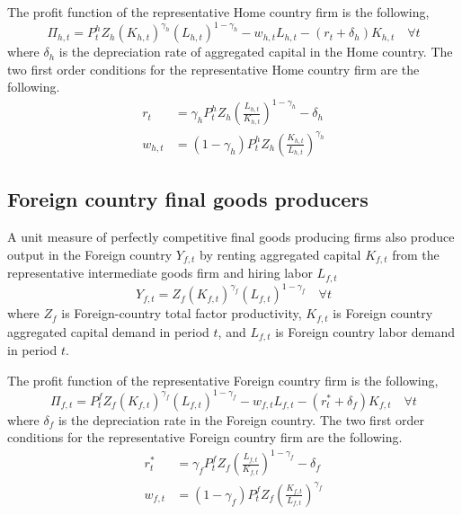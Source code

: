 \documentclass[letterpaper,12pt]{article}
\theoremstyle{definition}
\begin{document}
    The profit function of the representative Home country firm is the following,
    \begin{equation}\label{EqLgOpenProfit_H}
      \Pi_{h,t} = P^h_t Z_h \left(K_{h,t}\right)^{\gamma_h}\left(L_{h,t}\right)^{1-\gamma_h} - w_{h,t}L_{h,t} - (r_t + \delta_h)K_{h,t} \quad\forall t
    \end{equation}
    where $\delta_h$ is the depreciation rate of aggregated capital in the Home country. The two first order conditions for the representative Home country firm are the following.
    \begin{align}
      r_t &= \gamma_h P^h_t Z_h\left(\frac{L_{h,t}}{K_{h,t}}\right)^{1-\gamma_h} - \delta_h \label{EqLgOpenFirmFOCK_H} \\
      w_{h,t} &= (1-\gamma_h)P^h_t Z_h\left(\frac{K_{h,t}}{L_{h,t}}\right)^{\gamma_h} \label{EqLgOpenFirmFOCL_H}
    \end{align}


  \subsection{Foreign country final goods producers}\label{SecLgOpenFirmFinal_F}

    A unit measure of perfectly competitive final goods producing firms also produce output in the Foreign country $Y_{f,t}$ by renting aggregated capital $K_{f,t}$ from the representative intermediate goods firm and hiring labor $L_{f,t}$
    \begin{equation}\label{EqLgOpenProdFunc_F}
      Y_{f,t} = Z_f \left(K_{f,t}\right)^{\gamma_f}\left(L_{f,t}\right)^{1-\gamma_f} \quad\forall t
    \end{equation}
    where $Z_f$ is Foreign-country total factor productivity, $K_{f,t}$ is Foreign country aggregated capital demand in period $t$, and $L_{f,t}$ is Foreign country labor demand in period $t$.

    The profit function of the representative Foreign country firm is the following,
    \begin{equation}\label{EqLgOpenProfit_F}
      \Pi_{f,t} = P^f_t Z_f \left(K_{f,t}\right)^{\gamma_f}\left(L_{f,t}\right)^{1-\gamma_f} - w_{f,t}L_{f,t} - (r^*_t + \delta_f)K_{f,t} \quad\forall t
    \end{equation}
    where $\delta_f$ is the depreciation rate in the Foreign country. The two first order conditions for the representative Foreign country firm are the following.
    \begin{align}
      r^*_t &= \gamma_f P^f_t Z_f\left(\frac{L_{f,t}}{K_{f,t}}\right)^{1-\gamma_f} - \delta_f \label{EqLgOpenFirmFOCK_F} \\
      w_{f,t} &= (1-\gamma_f)P^f_t Z_f\left(\frac{K_{f,t}}{L_{f,t}}\right)^{\gamma_f} \label{EqLgOpenFirmFOCL_F}
    \end{align}
\end{document}
